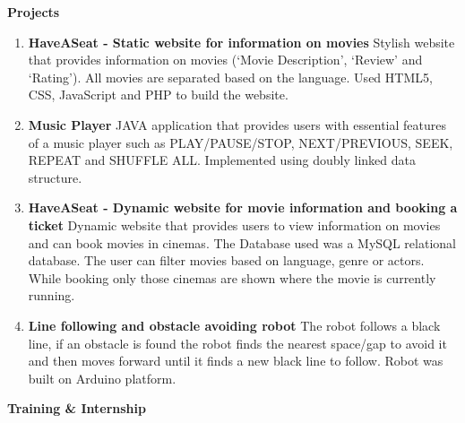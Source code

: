 \documentclass[a4paper,12pt,final]{memoir}
\newcommand{\Sep}{\vspace{1.5em}}
\newcommand{\SmallSep}{\vspace{0.5em}}
\newcommand{\CVSection}[1]
{\Large\textbf{#1}\par
	\SmallSep\normalsize\normalfont}
\begin{document}
	\CVSection{Projects}
		\begin{enumerate}
			\item \textbf{HaveASeat - Static website for information on movies} \newline
			{\footnotesize Stylish website that provides information on movies (‘Movie Description’, ‘Review’ and ‘Rating’). All movies are separated based on the language. Used HTML5, CSS, JavaScript and PHP to build the website.}
			\item \textbf{Music Player} \newline
			{\footnotesize JAVA application that provides users with essential features of a music player such as PLAY/PAUSE/STOP, NEXT/PREVIOUS, SEEK, REPEAT and SHUFFLE ALL. Implemented using doubly linked data structure.}
			\item \textbf{HaveASeat - Dynamic website for movie information and booking a ticket} \newline
			{\footnotesize Dynamic website that provides users to view information on movies and can book movies in cinemas. The Database used was a MySQL relational database. The user can filter movies based on language, genre or actors. While booking only those cinemas are shown where the movie is currently running.}
			\item \textbf{Line following and obstacle avoiding robot} \newline
			{\footnotesize The robot follows a black line, if an obstacle is found the robot finds the nearest space/gap to avoid it and then moves forward until it finds a new black line to follow. Robot was built on Arduino platform.}
		\end{enumerate}
	\Sep
	\clearpage
	\framebreak
	\framebreak
	\CVSection{Training \& Internship}
\end{document}
